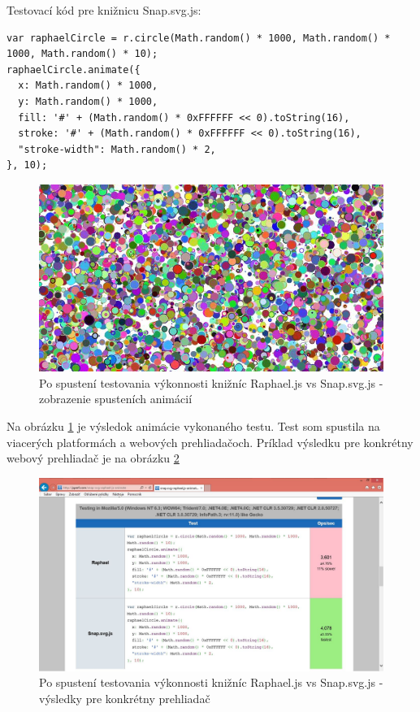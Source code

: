 Testovací kód pre knižnicu Snap.svg.js:
\begin{lstlisting}
var raphaelCircle = r.circle(Math.random() * 1000, Math.random() * 1000, Math.random() * 10);
raphaelCircle.animate({
  x: Math.random() * 1000,
  y: Math.random() * 1000,
  fill: '#' + (Math.random() * 0xFFFFFF << 0).toString(16),
  stroke: '#' + (Math.random() * 0xFFFFFF << 0).toString(16),
  "stroke-width": Math.random() * 2,
}, 10);
\end{lstlisting}


 \begin{figure}[H]
\centering
\includegraphics[width=0.7\linewidth]{obrazky/testovanieSnapVsRaphael.jpg}
\caption{Po spustení testovania výkonnosti knižníc Raphael.js vs Snap.svg.js - zobrazenie spusteních animácií}
\label{fig:podpora2}
\end{figure}


Na obrázku \ref{fig:podpora2} je výsledok animácie vykonaného testu. Test som spustila na viacerých platformách a webových prehliadačoch. Príklad výsledku pre konkrétny webový prehliadač je na obrázku \ref{fig:vyslMozila}



 \begin{figure}[H]
\centering
\includegraphics[width=0.7\linewidth]{obrazky/testovanieSnapVsRaphael2.jpg}
\caption{Po spustení testovania výkonnosti knižníc Raphael.js vs Snap.svg.js - výsledky pre konkrétny prehliadač}
\label{fig:vyslMozila}
\end{figure}

